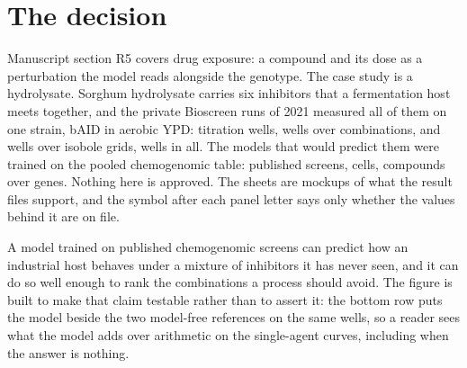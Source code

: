 
\section{The decision}
\label{sec:decision}

Manuscript section R5 covers drug exposure: a compound and its dose as a perturbation the
model reads alongside the genotype. The case study is a hydrolysate. Sorghum hydrolysate
carries six inhibitors that a fermentation host meets together, and the private Bioscreen
runs of 2021 measured all \hydnInhibitors{} of them on one strain, bAID in aerobic YPD:
\hydnExTwoOneWells{} titration wells, \hydnExTwoThreeWells{} wells over
\hydnCombinations{} combinations, and \hydnIsoboleWells{} wells over \hydnIsoboles{}
isobole grids, \hydnWells{} wells in all. The models that would predict them were trained
on the pooled chemogenomic table: \hydnScreens{} published screens, \hydnPoolCells{} cells,
\hydnPoolCompounds{} compounds over \hydnPoolGenes{} genes. Nothing here is approved. The
sheets are mockups of what the result files support, and the symbol after each panel
letter says only whether the values behind it are on file. 

 A model trained on published chemogenomic screens can
predict how an industrial host behaves under a mixture of inhibitors it has never seen,
and it can do so well enough to rank the combinations a process should avoid. The figure
is built to make that claim testable rather than to assert it: the bottom row puts the
model beside the two model-free references on the same wells, so a reader sees what the
model adds over arithmetic on the single-agent curves, including when the answer is
nothing.

